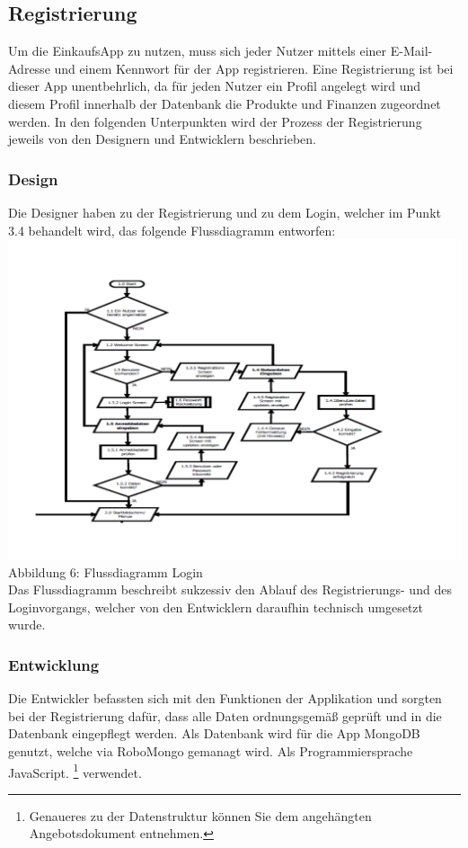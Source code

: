 \documentclass[12pt,a4paper]{article}
\begin{document}
\subsection{Registrierung}
Um die EinkaufsApp zu nutzen, muss sich jeder Nutzer mittels einer E-Mail-Adresse und einem Kennwort für der App registrieren.
Eine Registrierung ist bei dieser App unentbehrlich, da für jeden Nutzer ein Profil angelegt wird und diesem Profil innerhalb der Datenbank die Produkte und Finanzen zugeordnet werden.
In den folgenden Unterpunkten wird der Prozess der Registrierung jeweils von den Designern und Entwicklern beschrieben.
\subsubsection*{Design}
Die Designer haben zu der Registrierung und zu dem Login, welcher im Punkt 3.4 behandelt wird, das folgende Flussdiagramm entworfen:
\\
\hspace*{-10mm} \includegraphics[trim = 17mm 0mm 0mm 20mm, clip, scale=0.8]{Login-PDF.pdf}
\footnotesize Abbildung 6: Flussdiagramm Login
\normalsize
\\
\linebreak
Das Flussdiagramm beschreibt sukzessiv den Ablauf des Registrierungs- und des Loginvorgangs, welcher von den Entwicklern daraufhin technisch umgesetzt wurde.
\newpage
\subsubsection*{Entwicklung}
Die Entwickler befassten sich mit den Funktionen der Applikation  und sorgten bei der Registrierung dafür, dass alle Daten ordnungsgemäß geprüft und in die Datenbank eingepflegt werden.
Als Datenbank wird für die App MongoDB genutzt, welche via RoboMongo gemanagt wird. Als Programmiersprache JavaScript.
\footnote{Genaueres zu der Datenstruktur können Sie dem angehängten Angebotsdokument entnehmen.} verwendet.
\end{document}
